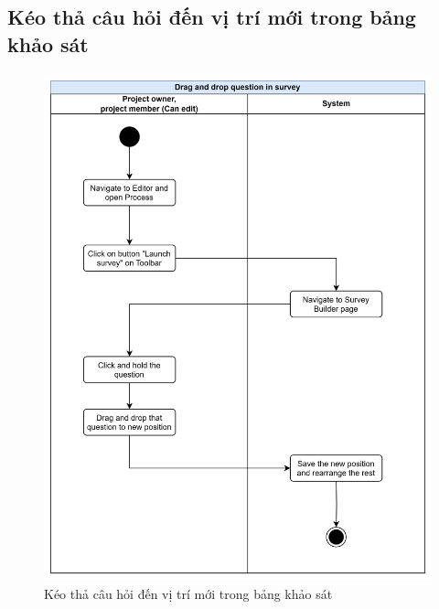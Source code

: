\subsection{Kéo thả câu hỏi đến vị trí mới trong bảng khảo sát}
\begin{figure}[H]
    \centering
    \includegraphics[width=0.8\linewidth]{Content/Phân tích và thiết kế hệ thống/documents/Sơ đồ hoạt động/images/dragAnDropQuestionInSurvey.png}
    \vspace{0.5cm}
    \caption{Kéo thả câu hỏi đến vị trí mới trong bảng khảo sát}
    \label{fig:Kéo thả câu hỏi đến vị trí mới trong bảng khảo sát}
\end{figure}
